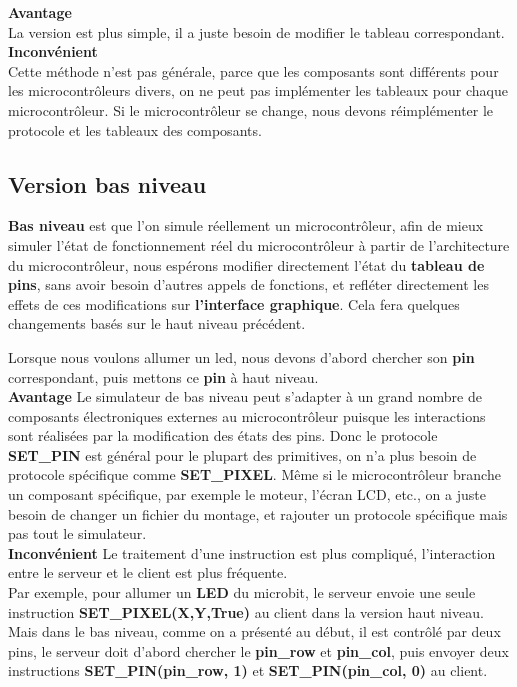 \documentclass[14px]{article}
\begin{document}
	\textbf{Avantage}\\
	La version est plus simple, il a juste besoin de modifier le tableau correspondant.\\

	\textbf{Inconvénient}\\
	Cette méthode n'est pas générale, parce que les composants sont différents pour les microcontrôleurs divers, on ne peut pas implémenter les tableaux pour chaque microcontrôleur.
	Si le microcontrôleur se change, nous devons réimplémenter le protocole et les tableaux des composants.


	\subsection{Version bas niveau}
	\textbf{Bas niveau} est que l'on simule réellement un microcontrôleur, afin de mieux simuler l'état de fonctionnement réel du microcontrôleur à partir de l'architecture du microcontrôleur, nous espérons modifier directement l'état du \textbf{tableau de pins}, sans avoir besoin d'autres appels de fonctions, et refléter directement les effets de ces modifications sur \textbf{l'interface graphique}. Cela fera quelques changements basés sur le haut niveau précédent.

	Lorsque nous voulons allumer un led, nous devons d'abord chercher son \textbf{pin} correspondant, puis mettons ce \textbf{pin} à haut niveau.\\

	\textbf{Avantage}
	Le simulateur de bas niveau peut s'adapter à un grand nombre de composants électroniques externes au microcontrôleur puisque les interactions sont réalisées par la modification des états des pins. Donc le protocole \textbf{SET\_PIN} est général pour le plupart des primitives, on n'a plus besoin de protocole spécifique comme \textbf{SET\_PIXEL}. Même si le microcontrôleur branche un composant spécifique, par exemple le moteur, l'écran LCD, etc., on a juste besoin de changer un fichier du montage, et rajouter un protocole spécifique mais pas tout le simulateur.\\

	\textbf{Inconvénient}
	Le traitement d'une instruction est plus compliqué, l'interaction entre le serveur et le client est plus fréquente.\\
	Par exemple, pour allumer un \textbf{LED} du microbit, le serveur envoie une seule instruction \textbf{SET\_PIXEL(X,Y,True)} au client dans la version haut niveau. Mais dans le bas niveau, comme on a présenté au début, il est contrôlé par deux pins, le serveur doit d'abord chercher le \textbf{pin\_row} et \textbf{pin\_col}, puis envoyer deux instructions \textbf{SET\_PIN(pin\_row, 1)} et \textbf{SET\_PIN(pin\_col, 0)} au client.
\end{document}
